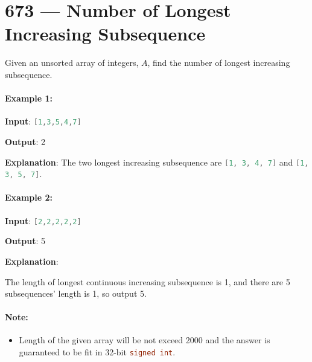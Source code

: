\section{673 --- Number of Longest Increasing Subsequence}
Given an unsorted array of integers, $A$,  find the number of longest increasing subsequence.

\paragraph{Example 1:}
\begin{flushleft}


\textbf{Input}: \lstinline[language=C++, basicstyle=\small\ttfamily, keywordstyle=\bfseries\color{green!40!black}]|[1,3,5,4,7]|

\textbf{Output}: 2

\textbf{Explanation}: The two longest increasing subsequence are \lstinline[language=C++, basicstyle=\small\ttfamily, keywordstyle=\bfseries\color{green!40!black}]|[1, 3, 4, 7]| and \lstinline[language=C++, basicstyle=\small\ttfamily, keywordstyle=\bfseries\color{green!40!black}]|[1, 3, 5, 7]|.
\end{flushleft}

\paragraph{Example 2:}
\begin{flushleft}


\textbf{Input}: \lstinline[language=C++, basicstyle=\small\ttfamily, keywordstyle=\bfseries\color{green!40!black}]|[2,2,2,2,2]|

\textbf{Output}: 5

\textbf{Explanation}: 

The length of longest continuous increasing subsequence is 1, and there are 5 subsequences' length is 1, so output 5.
\end{flushleft}

\paragraph{Note:} 
\begin{itemize}
\item Length of the given array will be not exceed 2000 and the answer is guaranteed to be fit in 32-bit \lstinline[language=C++, basicstyle=\small\ttfamily, keywordstyle=\bfseries\color{green!40!black}]|signed int|.
\end{itemize}

